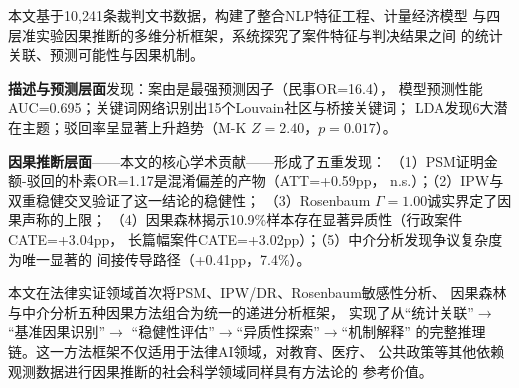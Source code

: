 \documentclass[12pt,a4paper,twoside]{ctexart}
\begin{document}
本文基于10,241条裁判文书数据，构建了整合NLP特征工程、计量经济模型
与四层准实验因果推断的多维分析框架，系统探究了案件特征与判决结果之间
的统计关联、预测可能性与因果机制。

\textbf{描述与预测层面}发现：案由是最强预测因子（民事OR=16.4），
模型预测性能AUC=0.695；关键词网络识别出15个Louvain社区与桥接关键词；
LDA发现6大潜在主题；驳回率呈显著上升趋势（M-K $Z=2.40$，$p=0.017$）。

\textbf{因果推断层面}——本文的核心学术贡献——形成了五重发现：
（1）PSM证明金额-驳回的朴素OR=1.17是混淆偏差的产物（ATT=+0.59pp，
n.s.）；（2）IPW与双重稳健交叉验证了这一结论的稳健性；
（3）Rosenbaum $\Gamma=1.00$诚实界定了因果声称的上限；
（4）因果森林揭示10.9\%样本存在显著异质性（行政案件CATE=+3.04pp，
长篇幅案件CATE=+3.02pp）；（5）中介分析发现争议复杂度为唯一显著的
间接传导路径（+0.41pp，7.4\%）。

本文在法律实证领域首次将PSM、IPW/DR、Rosenbaum敏感性分析、
因果森林与中介分析五种因果方法组合为统一的递进分析框架，
实现了从``统计关联''$\rightarrow$``基准因果识别''$\rightarrow$
``稳健性评估''$\rightarrow$``异质性探索''$\rightarrow$``机制解释''
的完整推理链。这一方法框架不仅适用于法律AI领域，对教育、医疗、
公共政策等其他依赖观测数据进行因果推断的社会科学领域同样具有方法论的
参考价值。

\newpage


\end{document}

